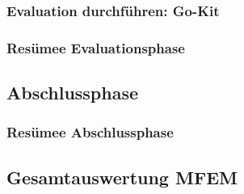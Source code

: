 \subsubsection{Evaluation durchführen: Go-Kit}


\subsubsection{Resümee Evaluationsphase}

\subsection{Abschlussphase}
\subsubsection{Resümee Abschlussphase}


\subsection{Gesamtauswertung \ac*{MFEM}}




